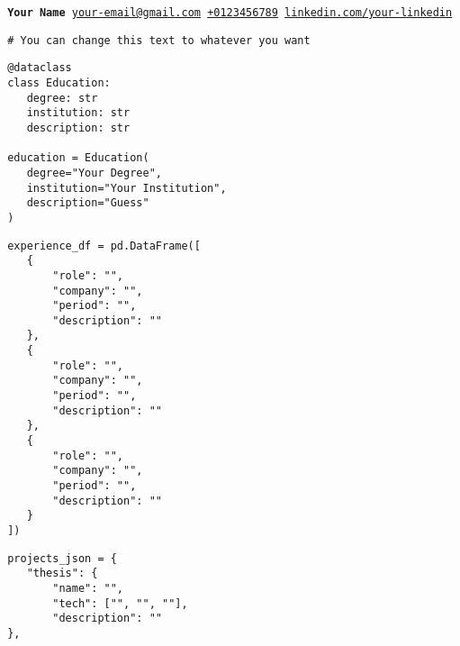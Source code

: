 \documentclass{article}
\begin{document}
\texttt{
\textbf{Your Name}
\textbar{}
\href{mailto:your-email@gmail.com}{your-email@gmail.com} \textbar{} 
\href{tel:+0123456789}{+0123456789} \textbar{}
\href{https://linkedin.com/in/your-linkedin}{linkedin.com/your-linkedin}}\\


\begin{mdframed}[
    linewidth=1.6pt,
    linecolor=borderGray,
    leftmargin=0pt,
    rightmargin=0pt,
    innerleftmargin=0pt,
    innerrightmargin=0pt,
    innertopmargin=-6pt,
    innerbottommargin=-6pt,
]
\begin{lstlisting}
 # You can change this text to whatever you want

\end{lstlisting}
\end{mdframed}

\vspace{-0.75cm}

\begin{mdframed}[
    linewidth=1.6pt,
    linecolor=borderGray,
    leftmargin=0pt,
    rightmargin=0pt,
    innerleftmargin=0pt,
    innerrightmargin=0pt,
    innertopmargin=-6pt,
    innerbottommargin=-6pt,
]
\begin{lstlisting}
 @dataclass
 class Education:
    degree: str
    institution: str
    description: str

 education = Education(
    degree="Your Degree",
    institution="Your Institution",
    description="Guess"
 )
\end{lstlisting}
\end{mdframed}
\vspace{-0.75cm}

\begin{mdframed}[
    linewidth=1.6pt,
    linecolor=borderGray,
    leftmargin=0pt,
    rightmargin=0pt,
    innerleftmargin=0pt,
    innerrightmargin=0pt,
    innertopmargin=-6pt,
    innerbottommargin=-6pt,
]
\begin{lstlisting}
 experience_df = pd.DataFrame([
    {
        "role": "",
        "company": "",
        "period": "",
        "description": ""
    },
    {
        "role": "",
        "company": "",
        "period": "",
        "description": ""
    },
    {
        "role": "",
        "company": "",
        "period": "",
        "description": ""
    }
 ])
\end{lstlisting}
\end{mdframed}

\vspace{-0.75cm}

\begin{mdframed}[
    linewidth=1.6pt,
    linecolor=borderGray,
    leftmargin=0pt,
    rightmargin=0pt,
    innerleftmargin=0pt,
    innerrightmargin=0pt,
    innertopmargin=-6pt,
    innerbottommargin=-6pt,
]
\begin{lstlisting}
 projects_json = {
    "thesis": {
        "name": "",
        "tech": ["", "", ""],
        "description": ""
 },

\end{lstlisting}
\end{mdframed}
\end{document}
